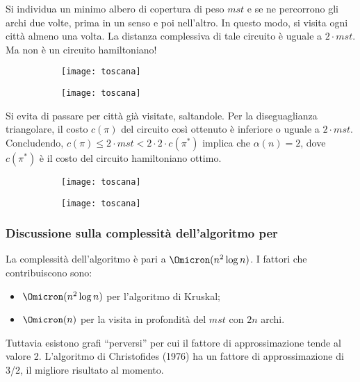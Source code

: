 Si individua un minimo albero di copertura di peso \(\mathit{mst}\) e se ne percorrono gli archi due volte, prima in un senso e poi nell'altro.
In questo modo, si visita ogni città almeno una volta.
La distanza complessiva di tale circuito è uguale a \(2 \cdot mst\).
Ma non è un circuito hamiltoniano!

\begin{figure}[H]\centering
	\begin{subfigure}[t]{.5\linewidth}\centering
		\texttt{[image: toscana]}
	\end{subfigure}%
	\begin{subfigure}[t]{.5\linewidth}\centering
		\texttt{[image: toscana]}
	\end{subfigure}
\end{figure}

Si evita di passare per città già visitate, saltandole.
Per la diseguaglianza triangolare, il costo \(c(\pi)\) del circuito così ottenuto è inferiore o uguale a \(2 \cdot \mathit{mst}\).
Concludendo, \(c(\pi) \leqslant 2 \cdot \mathit{mst} < 2 \cdot 2 \cdot c(\pi^*)\) implica che \(\alpha(n) = 2\), dove \(c(\pi^*)\) è il costo del circuito hamiltoniano ottimo.

\begin{figure}[H]\centering
	\begin{subfigure}[t]{.5\linewidth}\centering
		\texttt{[image: toscana]}
	\end{subfigure}%
	\begin{subfigure}[t]{.5\linewidth}\centering
		\texttt{[image: toscana]}
	\end{subfigure}
\end{figure}

\subsubsection{Discussione sulla complessità dell'algoritmo per {\deltaTsp}}

La complessità dell'algoritmo è pari a \(\Omicron(n^2 \log n)\).
I fattori che contribuiscono sono:
\begin{itemize}
	\item \(\Omicron(n^2 \log n)\) per l'algoritmo di Kruskal;
	\item \(\Omicron(n)\) per la visita in profondità del \(\mathit{mst}\) con \(2n\) archi.
\end{itemize}
Tuttavia esistono grafi \enquote{perversi} per cui il fattore di approssimazione tende al valore 2.
L'algoritmo di Christofides (1976) ha un fattore di approssimazione di 3/2, il migliore risultato al momento.

